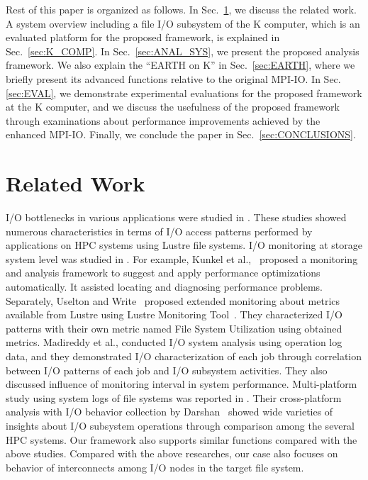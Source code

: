 \documentclass{jhps}
\begin{document}
Rest of this paper is organized as follows.
In Sec.~\ref{sec:RELATED_WORK}, we discuss the related work.
A system overview including a file I/O subsystem of the K computer,
which is an evaluated platform for the proposed framework,
is explained in Sec.~\ref{sec:K_COMP}.
In Sec.~\ref{sec:ANAL_SYS}, we present the proposed analysis framework.
We also explain the ``EARTH on K'' in Sec.~\ref{sec:EARTH},
where we briefly present its advanced functions relative to the original MPI-IO.
In Sec.\ref{sec:EVAL}, we demonstrate experimental evaluations
for the proposed framework at the K computer, and we discuss the usefulness
of the proposed framework through examinations about performance improvements
achieved by the enhanced MPI-IO.
Finally, we conclude the paper in Sec.~\ref{sec:CONCLUSIONS}.

\section{Related Work}
\label{sec:RELATED_WORK}

I/O bottlenecks in various applications were studied in \cite{xie:sc12,saini:hipc12}.
These studies showed numerous characteristics in terms of I/O access patterns
performed by applications on HPC systems using Lustre file systems.
I/O monitoring at storage system level was studied
in \cite{isc14:kunkel,uselton:cug13,madireddy:nas17}.
For example, Kunkel et al.,~\cite{isc14:kunkel} proposed a monitoring and analysis framework
to suggest and apply performance optimizations automatically.
It assisted locating and diagnosing performance problems.
Separately, Uselton and Write~\cite{uselton:cug13} proposed extended monitoring
about metrics available from Lustre using Lustre Monitoring Tool~\cite{LMT:GitHub}.
They characterized I/O patterns with their own metric named File System Utilization
using obtained metrics.
Madireddy et al.,\cite{madireddy:nas17} conducted I/O system analysis
using operation log data, and they demonstrated I/O characterization
of each job through correlation between I/O patterns of each job and I/O
subsystem activities.
They also discussed influence of monitoring interval in system performance.
Multi-platform study using system logs of file systems was reported
in \cite{luu:HPDC2015}.
Their cross-platform analysis with I/O behavior collection by Darshan~\cite{darshan:web}
showed wide varieties of insights about I/O subsystem operations
through comparison among the several HPC systems.
Our framework also supports similar functions compared with the above studies.
Compared with the above researches, our case also focuses on behavior
of interconnects among I/O nodes in the target file system.
\end{document}
